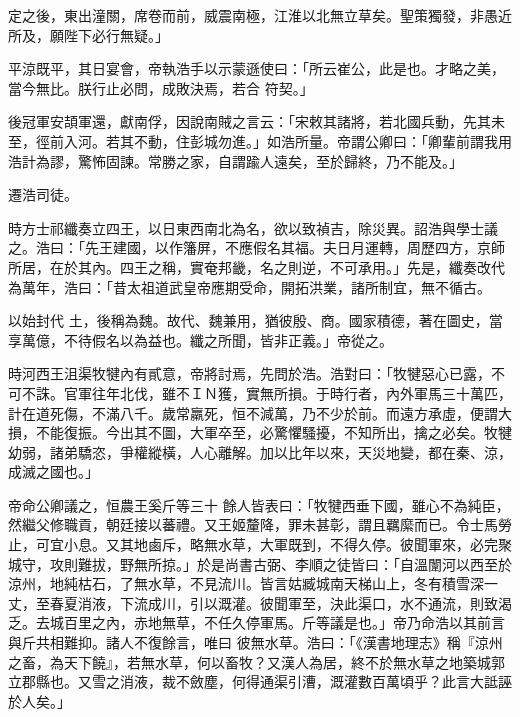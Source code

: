\begin{pinyinscope}
 定之後，東出潼關，席卷而前，威震南極，江淮以北無立草矣。聖策獨發，非愚近所及，願陛下必行無疑。」



 平涼既平，其日宴會，帝執浩手以示蒙遜使曰：「所云崔公，此是也。才略之美，當今無比。朕行止必問，成敗決焉，若合
 符契。」



 後冠軍安頡軍還，獻南俘，因說南賊之言云：「宋敕其諸將，若北國兵動，先其未至，徑前入河。若其不動，住彭城勿進。」如浩所量。帝謂公卿曰：「卿輩前謂我用浩計為謬，驚怖固諫。常勝之家，自謂踰人遠矣，至於歸終，乃不能及。」



 遷浩司徒。



 時方士祁纖奏立四王，以日東西南北為名，欲以致禎吉，除災異。詔浩與學士議之。浩曰：「先王建國，以作籓屏，不應假名其福。夫日月運轉，周歷四方，京師所居，在於其內。四王之稱，實奄邦畿，名之則逆，不可承用。」先是，纖奏改代為萬年，浩曰：「昔太祖道武皇帝應期受命，開拓洪業，諸所制宜，無不循古。



 以始封代
 土，後稱為魏。故代、魏兼用，猶彼殷、商。國家積德，著在圖史，當享萬億，不待假名以為益也。纖之所聞，皆非正義。」帝從之。



 時河西王沮渠牧犍內有貳意，帝將討焉，先問於浩。浩對曰：「牧犍惡心已露，不可不誅。官軍往年北伐，雖不ＩＮ獲，實無所損。于時行者，內外軍馬三十萬匹，計在道死傷，不滿八千。歲常羸死，恒不減萬，乃不少於前。而遠方承虛，便謂大損，不能復振。今出其不圖，大軍卒至，必驚懼騷擾，不知所出，擒之必矣。牧犍幼弱，諸弟驕恣，爭權縱橫，人心離解。加以比年以來，天災地變，都在秦、涼，成滅之國也。」



 帝命公卿議之，恒農王奚斤等三十
 餘人皆表曰：「牧犍西垂下國，雖心不為純臣，然繼父修職貢，朝廷接以蕃禮。又王姬釐降，罪未甚彰，謂且羈縻而已。令士馬勞止，可宜小息。又其地鹵斥，略無水草，大軍既到，不得久停。彼聞軍來，必完聚城守，攻則難拔，野無所掠。」於是尚書古弼、李順之徒皆曰：「自溫闈河以西至於涼州，地純枯石，了無水草，不見流川。皆言姑臧城南天梯山上，冬有積雪深一丈，至春夏消液，下流成川，引以溉灌。彼聞軍至，決此渠口，水不通流，則致渴乏。去城百里之內，赤地無草，不任久停軍馬。斤等議是也。」帝乃命浩以其前言與斤共相難抑。諸人不復餘言，唯曰
 彼無水草。浩曰：「《漢書地理志》稱『涼州之畜，為天下饒』，若無水草，何以畜牧？又漢人為居，終不於無水草之地築城郭立郡縣也。又雪之消液，裁不斂塵，何得通渠引漕，溉灌數百萬頃乎？此言大詆誣於人矣。」




\end{pinyinscope}
